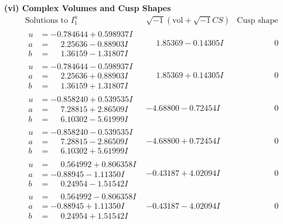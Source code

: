 \documentclass[1p]{elsarticle_modified}
\theoremstyle{definition}
\newcommand{\I}{\sqrt{-1}}
\begin{document}
\newpage\flushleft \textbf{(vi) Complex Volumes and Cusp Shapes}
$$\begin{array}{c|c|c}  
\text{Solutions to }I^u_{1}& \I (\text{vol} + \sqrt{-1}CS) & \text{Cusp shape}\\
 \hline 
\begin{aligned}
u &= -0.784644 + 0.598937 I \\
a &= \phantom{-}2.25636 - 0.88903 I \\
b &= \phantom{-}1.36159 - 1.31807 I\end{aligned}
 & \phantom{-}1.85369 - 0.14305 I & \phantom{-0.000000 } 0 \\ \hline\begin{aligned}
u &= -0.784644 - 0.598937 I \\
a &= \phantom{-}2.25636 + 0.88903 I \\
b &= \phantom{-}1.36159 + 1.31807 I\end{aligned}
 & \phantom{-}1.85369 + 0.14305 I & \phantom{-0.000000 } 0 \\ \hline\begin{aligned}
u &= -0.858240 + 0.539535 I \\
a &= \phantom{-}7.28815 + 2.86509 I \\
b &= \phantom{-}6.10302 - 5.61999 I\end{aligned}
 & -4.68800 - 0.72454 I & \phantom{-0.000000 } 0 \\ \hline\begin{aligned}
u &= -0.858240 - 0.539535 I \\
a &= \phantom{-}7.28815 - 2.86509 I \\
b &= \phantom{-}6.10302 + 5.61999 I\end{aligned}
 & -4.68800 + 0.72454 I & \phantom{-0.000000 } 0 \\ \hline\begin{aligned}
u &= \phantom{-}0.564992 + 0.806358 I \\
a &= -0.88945 - 1.11350 I \\
b &= \phantom{-}0.24954 - 1.51542 I\end{aligned}
 & -0.43187 + 4.02094 I & \phantom{-0.000000 } 0 \\ \hline\begin{aligned}
u &= \phantom{-}0.564992 - 0.806358 I \\
a &= -0.88945 + 1.11350 I \\
b &= \phantom{-}0.24954 + 1.51542 I\end{aligned}
 & -0.43187 - 4.02094 I & \phantom{-0.000000 } 0 \\ \hline\begin{aligned}

\end{aligned}
\end{array}$$
\end{document}
